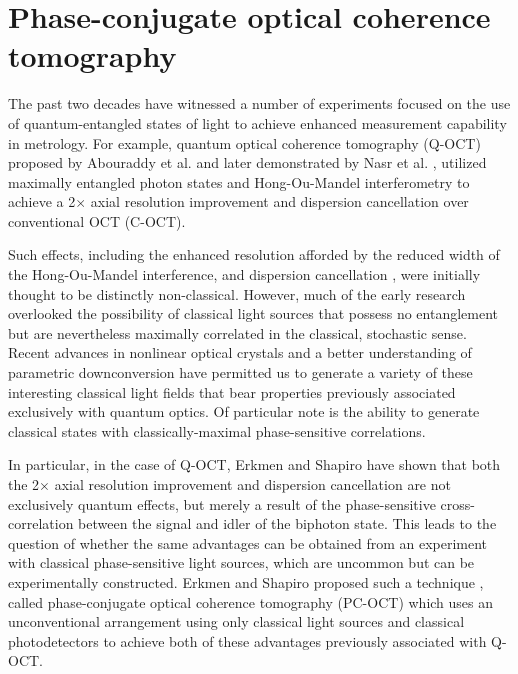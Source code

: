 \chapter{Phase-conjugate optical coherence tomography}

The past two decades have witnessed a number of experiments focused on the use of quantum-entangled states of light to achieve enhanced measurement capability in metrology. For example, quantum optical coherence tomography (Q-OCT) proposed by Abouraddy et al. \cite{abouraddy-qoct} and later demonstrated by Nasr et al. \cite{nasr-qoct}, utilized maximally entangled photon states and Hong-Ou-Mandel interferometry \cite{hong-measurement} to achieve a 2$\times$ axial resolution improvement and dispersion cancellation over conventional OCT (C-OCT).

Such effects, including the enhanced resolution afforded by the reduced width of the Hong-Ou-Mandel interference, and dispersion cancellation \cite{steinberg-dispersion,franson-dispersion}, were initially thought to be distinctly non-classical. However, much of the early research overlooked the possibility of classical light sources that possess no entanglement but are nevertheless maximally correlated in the classical, stochastic sense. Recent advances in nonlinear optical crystals and a better understanding of parametric downconversion have permitted us to generate a variety of these interesting classical light fields that bear properties previously associated exclusively with quantum optics. Of particular note is the ability to generate classical states with classically-maximal phase-sensitive correlations.

In particular, in the case of Q-OCT, Erkmen and Shapiro \cite{erkmen-pcoct} have shown that both the 2$\times$ axial resolution improvement and dispersion cancellation are not exclusively quantum effects, but merely a result of the phase-sensitive cross-correlation between the signal and idler of the biphoton state. This leads to the question of whether the same advantages can be obtained from an experiment with classical phase-sensitive light sources, which are uncommon but can be experimentally constructed. Erkmen and Shapiro proposed such a technique \cite{erkmen-pcoct}, called phase-conjugate optical coherence tomography (PC-OCT) which uses an unconventional arrangement using only classical light sources and classical photodetectors to achieve both of these advantages previously associated with Q-OCT.

